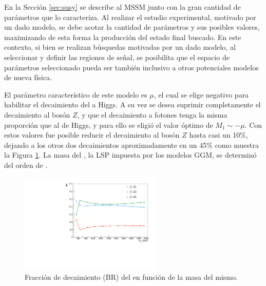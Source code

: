 En la Sección \ref{sec:susy} se describe al MSSM junto con la gran cantidad de parámetros que lo caracteriza. 
Al realizar el estudio experimental, motivado por un dado modelo, se debe acotar la cantidad de parámetros y sus posibles valores, maximizando de esta forma la producción del estado final buscado. En este contexto, si bien se realizan búsquedas motivadas por un dado modelo, al seleccionar y definir las regiones de señal, se posibilita que el espacio de parámetros seleccionado pueda ser también inclusivo a otros potenciales modelos de nueva física. 

El parámetro característico de este modelo es $\mu$, el cual se elige negativo para habilitar el decaimiento del \ninoone a Higgs. A su vez se desea suprimir completamente el decaimiento al bosón $Z$, y que el decaimiento a fotones tenga la misma proporción que al de Higgs, y para ello se eligió el valor óptimo de $M_1\sim -\mu$.
Con estos valores fue posible reducir el decaimiento al bosón $Z$ hasta casi un 10\%, dejando a los otros dos decaimientos aproximadamente en un 45\% como muestra la Figura \ref{fig:n1_br}. 
La masa del \gravino, la LSP impuesta por los modelos GGM, se determinó del orden de .

\begin{figure}
  \centering
  \includegraphics[width=0.6\textwidth]{images/analysis/phb_n1_br.pdf}
  \caption{Fracción de decaimiento (BR) del \ninoone en función de la masa del mismo.}
  \label{fig:n1_br}
\end{figure}

